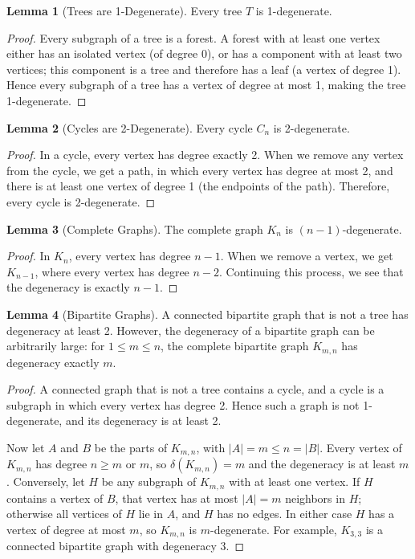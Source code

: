\documentclass{article}
\theoremstyle{definition}
\newtheorem{lemma}{Lemma}
\begin{document}
\begin{lemma}[Trees are 1-Degenerate]
Every tree $T$ is 1-degenerate.
\end{lemma}

\begin{proof}
Every subgraph of a tree is a forest. A forest with at least one vertex either has an isolated vertex (of degree 0), or has a component with at least two vertices; this component is a tree and therefore has a leaf (a vertex of degree 1). Hence every subgraph of a tree has a vertex of degree at most 1, making the tree 1-degenerate.
\end{proof}

\begin{lemma}[Cycles are 2-Degenerate]
Every cycle $C_n$ is 2-degenerate.
\end{lemma}

\begin{proof}
In a cycle, every vertex has degree exactly 2. When we remove any vertex from the cycle, we get a path, in which every vertex has degree at most 2, and there is at least one vertex of degree 1 (the endpoints of the path). Therefore, every cycle is 2-degenerate.
\end{proof}

\begin{lemma}[Complete Graphs]
The complete graph $K_n$ is $(n-1)$-degenerate.
\end{lemma}

\begin{proof}
In $K_n$, every vertex has degree $n-1$. When we remove a vertex, we get $K_{n-1}$, where every vertex has degree $n-2$. Continuing this process, we see that the degeneracy is exactly $n-1$.
\end{proof}

\begin{lemma}[Bipartite Graphs]
A connected bipartite graph that is not a tree has degeneracy at least 2. However, the degeneracy of a bipartite graph can be arbitrarily large: for $1 \leq m \leq n$, the complete bipartite graph $K_{m,n}$ has degeneracy exactly $m$.
\end{lemma}

\begin{proof}
A connected graph that is not a tree contains a cycle, and a cycle is a subgraph in which every vertex has degree 2. Hence such a graph is not 1-degenerate, and its degeneracy is at least 2.

Now let $A$ and $B$ be the parts of $K_{m,n}$, with $|A| = m \leq n = |B|$. Every vertex of $K_{m,n}$ has degree $n \geq m$ or $m$, so $\delta(K_{m,n}) = m$ and the degeneracy is at least $m$. Conversely, let $H$ be any subgraph of $K_{m,n}$ with at least one vertex. If $H$ contains a vertex of $B$, that vertex has at most $|A| = m$ neighbors in $H$; otherwise all vertices of $H$ lie in $A$, and $H$ has no edges. In either case $H$ has a vertex of degree at most $m$, so $K_{m,n}$ is $m$-degenerate. For example, $K_{3,3}$ is a connected bipartite graph with degeneracy 3.
\end{proof}
\end{document}
